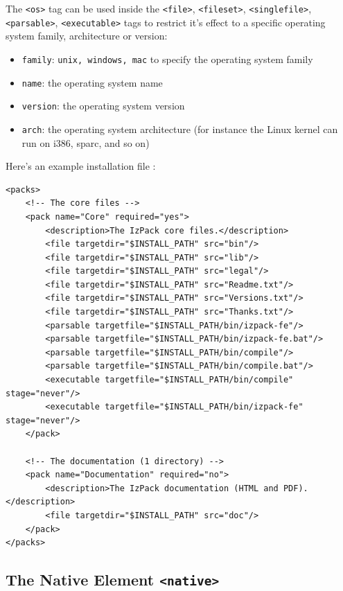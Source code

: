 The \texttt{<os>} tag can be used inside the \texttt{<file>},
\texttt{<fileset>}, \texttt{<singlefile>}, \texttt{<parsable>},
\texttt{<executable>} tags to restrict it's effect to a specific
operating system family, architecture or version:

\begin{itemize}

  \item \texttt{family}: \texttt{unix, windows, mac} to specify the
  operating system family
  \item \texttt{name}: the operating system name
  \item \texttt{version}: the operating system version
  \item \texttt{arch}: the operating system architecture (for instance the
  Linux kernel can run on i386, sparc, and so on)

\end{itemize}


Here's an example installation file :
\footnotesize
\begin{verbatim}
<packs>
    <!-- The core files -->
    <pack name="Core" required="yes">
        <description>The IzPack core files.</description>
        <file targetdir="$INSTALL_PATH" src="bin"/>
        <file targetdir="$INSTALL_PATH" src="lib"/>
        <file targetdir="$INSTALL_PATH" src="legal"/>
        <file targetdir="$INSTALL_PATH" src="Readme.txt"/>
        <file targetdir="$INSTALL_PATH" src="Versions.txt"/>
        <file targetdir="$INSTALL_PATH" src="Thanks.txt"/>
        <parsable targetfile="$INSTALL_PATH/bin/izpack-fe"/>
        <parsable targetfile="$INSTALL_PATH/bin/izpack-fe.bat"/>
        <parsable targetfile="$INSTALL_PATH/bin/compile"/>
        <parsable targetfile="$INSTALL_PATH/bin/compile.bat"/>
        <executable targetfile="$INSTALL_PATH/bin/compile" stage="never"/>
        <executable targetfile="$INSTALL_PATH/bin/izpack-fe" stage="never"/>
    </pack>
    
    <!-- The documentation (1 directory) -->
    <pack name="Documentation" required="no">
        <description>The IzPack documentation (HTML and PDF).</description>
        <file targetdir="$INSTALL_PATH" src="doc"/>
    </pack>
</packs>
\end{verbatim}
\normalsize

\subsection{The Native Element \texttt{<native>}}
\label{native-element}

